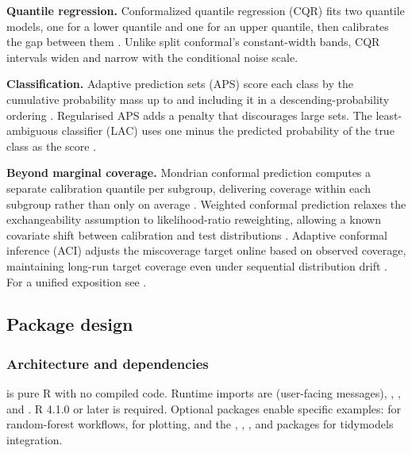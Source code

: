 \textbf{Quantile regression.} Conformalized quantile regression (CQR)
fits two quantile models, one for a lower quantile and one for an upper
quantile, then calibrates the gap between them
\citep{romano2019conformalized}. Unlike split conformal's constant-width
bands, CQR intervals widen and narrow with the conditional noise scale.

\textbf{Classification.} Adaptive prediction sets (APS) score each class
by the cumulative probability mass up to and including it in a
descending-probability ordering \citep{romano2020classification}.
Regularised APS \citep{angelopoulos2021uncertainty} adds a penalty that
discourages large sets. The least-ambiguous classifier (LAC) uses one
minus the predicted probability of the true class as the score
\citep{sadinle2019least}.

\textbf{Beyond marginal coverage.} Mondrian conformal prediction
computes a separate calibration quantile per subgroup, delivering
coverage within each subgroup rather than only on average
\citep{vovk2005algorithmic}. Weighted conformal prediction relaxes the
exchangeability assumption to likelihood-ratio reweighting, allowing a
known covariate shift between calibration and test distributions
\citep{tibshirani2019conformal}. Adaptive conformal inference (ACI)
adjusts the miscoverage target online based on observed coverage,
maintaining long-run target coverage even under sequential distribution
drift \citep{gibbs2021adaptive}. For a unified exposition see
\citet{angelopoulos2023gentle}.

\subsection{Package design}\label{package-design}

\subsubsection{Architecture and
dependencies}\label{architecture-and-dependencies}

 is pure R with no compiled code. Runtime imports
are  (user-facing messages), ,
, and . R 4.1.0 or later is required.
Optional packages enable specific examples:  for
random-forest workflows,  for plotting, and the
, , , and
 packages for tidymodels integration.

